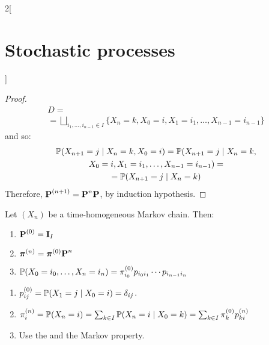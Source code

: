 \documentclass[../../../main_math.tex]{subfiles}
\begin{document}
\begin{multicols}{2}[\section{Stochastic processes}]
\begin{proof}
    \begin{multline*}
      D=\\\!=\bigsqcup_{i_1,\ldots,i_{n-1}\in I}\{X_n=k, X_0=i,X_1=i_1,\ldots,X_{n-1}=i_{n-1}\}
    \end{multline*}
    and so:
    \begin{multline*}
      \mathbb{P}(X_{n+1}=j\mid X_n=k, X_0=i)=\mathbb{P}(X_{n+1}=j\mid X_n=k,\\ X_0=i,X_1=i_1,\ldots,X_{n-1}=i_{n-1})=\\=\mathbb{P}(X_{n+1}=j\mid X_n=k)
    \end{multline*}
    Therefore, $\boldsymbol{\mathrm{P}}^{(n+1)}=\boldsymbol{\mathrm{P}}^n\boldsymbol{\mathrm{P}}$, by induction hypothesis.
  \end{proof}
  \begin{proposition}
    Let $(X_n)$ be a time-homogeneous Markov chain. Then:
    \begin{enumerate}
      \item $\boldsymbol{\mathrm{P}}^{(0)}=\boldsymbol{\mathrm{I}}_I$
      \item $\boldsymbol{\mathrm{\pi}}^{(n)}=\boldsymbol{\mathrm{\pi}}^{(0)}\boldsymbol{\mathrm{P}}^n$
      \item $\mathbb{P}(X_0=i_0,\ldots,X_n=i_n)=\pi_{i_0}^{(0)}p_{i_0i_1}\cdots p_{i_{n-1}i_n}$
    \end{enumerate}
  \end{proposition}
  \begin{sproof}
    \begin{enumerate}
      \item $p_{ij}^{(0)}=\mathbb{P}(X_1=j\mid X_0=i)=\delta_{ij}$.
      \item $\pi_i^{(n)}=\mathbb{P}(X_n=i)=\sum_{k\in I}\mathbb{P}(X_n=i\mid X_0=k)=\sum_{k\in I}\pi_k^{(0)}p_{ki}^{(n)}$
      \item Use the  and the Markov property.
    \end{enumerate}
  \end{sproof}

\end{multicols}
\end{document}
